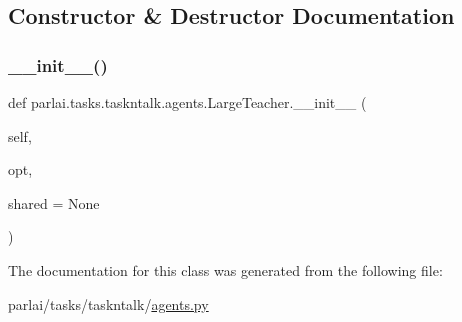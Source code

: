 \subsection{Constructor \& Destructor Documentation}
\mbox{\label{classparlai_1_1tasks_1_1taskntalk_1_1agents_1_1LargeTeacher_af178f2514d254ac1ae9b0d956041d13c}} 
\subsubsection{\texorpdfstring{\+\_\+\+\_\+init\+\_\+\+\_\+()}{\_\_init\_\_()}}
{\footnotesize\ttfamily def parlai.\+tasks.\+taskntalk.\+agents.\+Large\+Teacher.\+\_\+\+\_\+init\+\_\+\+\_\+ (\begin{DoxyParamCaption}\item[{}]{self,  }\item[{}]{opt,  }\item[{}]{shared = {\ttfamily None} }\end{DoxyParamCaption})}



The documentation for this class was generated from the following file\+:\begin{DoxyCompactItemize}
\item 
parlai/tasks/taskntalk/\hyperlink{parlai_2tasks_2taskntalk_2agents_8py}{agents.\+py}\end{DoxyCompactItemize}
